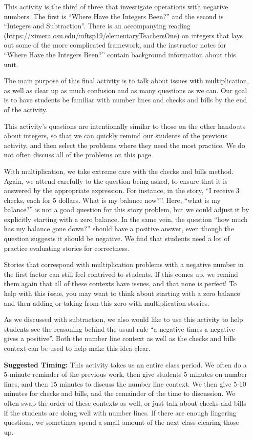 \documentclass[nooutcomes]{ximera}
\begin{document}
\newpage
\begin{instructorNotes}
This activity is the third of three that investigate operations with negative numbers.  The first is ``Where Have the Integers Been?'' and the second is ``Integers and Subtraction''.  There is an accompanying reading (\url{https://ximera.osu.edu/mftsp19/elementaryTeachersOne}) on integers that lays out some of the more complicated framework, and the instructor notes for ``Where Have the Integers Been?'' contain background information about this unit.

The main purpose of this final activity is to talk about issues with multiplication, as well as clear up as much confusion and as many questions as we can.  Our goal is to have students be familiar with number lines and checks and bills by the end of the activity.

This activity's questions are intentionally similar to those on the other handouts about integers, so that we can quickly remind our students of the previous activity, and then select the problems where they need the most practice.  We do not often discuss all of the problems on this page.

With multiplication, we take extreme care with the checks and bills method.  Again, we attend carefully to the question being asked, to ensure that it is answered by the appropriate expression.  For instance, in the story, ``I receive 3 checks, each for 5 dollars.  What is my balance now?''.  Here, ``what is my balance?'' is not a good question for this story problem, but we could adjust it by explicitly starting with a zero balance.  In the same vein, the question ``how much has my balance gone down?'' should have a positive answer, even though the question suggests it should be negative.  We find that students need a lot of practice evaluating stories for correctness.

Stories that correspond with multiplication problems with a negative number in the first factor can still feel contrived to students.  If this comes up, we remind them again that all of these contexts have issues, and that none is perfect!  To help with this issue, you may want to think about starting with a zero balance and then adding or taking from this zero with multiplication stories.  

As we discussed with subtraction, we also would like to use this activity to help students see the reasoning behind the usual rule ``a negative times a negative gives a positive''.  Both the number line context as well as the checks and bills context can be used to help make this idea clear.

{\bf Suggested Timing:} This activity takes us an entire class period.  We often do a 5-minute reminder of the previous work, then give students 5 minutes on number lines, and then 15 minutes to discuss the number line context.  We then give 5-10 minutes for checks and bills, and the remainder of the time to discussion.  We often swap the order of these contexts as well, or just talk about checks and bills if the students are doing well with number lines.  If there are enough lingering questions, we sometimes spend a small amount of the next class clearing those up.
\end{instructorNotes}
\end{document}

